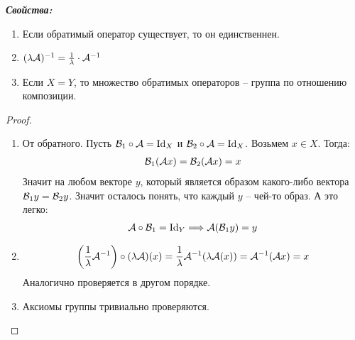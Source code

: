 \textit{\textbf{Свойства: }}
\begin{enumerate}
    \item Если обратимый оператор существует, то он единственнен. 
    \item $(\lambda \mathcal{A})^{-1} = \frac{1}{\lambda} \cdot \mathcal{A}^{-1}$
    \item Если $X = Y$, то множество обратимых операторов -- группа по отношению композиции. 
\end{enumerate}
\begin{proof} \quad

    \begin{enumerate}
        \item От обратного. Пусть $\mathcal{B}_1 \circ \mathcal{A} = \operatorname{Id}_X$ и $\mathcal{B}_2 \circ \mathcal{A} = \operatorname{Id}_X$. Возьмем $x \in X$. Тогда:
        \begin{gather*}
            \mathcal{B}_1(\mathcal{A} x) = \mathcal{B}_2(\mathcal{A} x) = x
        \end{gather*}
        Значит на любом векторе $y$, который является образом какого-либо вектора $\mathcal{B}_1 y = \mathcal{B}_2 y$. Значит осталось понять, что каждый $y$ -- чей-то образ. А это легко:
        \begin{gather*}
            \mathcal{A} \circ \mathcal{B}_1 = \operatorname{Id}_Y \Longrightarrow \mathcal{A}(\mathcal{B}_1 y) = y
        \end{gather*}
        \item \begin{gather*}
            \left( \frac{1}{\lambda} \mathcal{A}^{-1}\right) \circ (\lambda \mathcal{A})(x) = \frac{1}{\lambda} \mathcal{A}^{-1} (\lambda \mathcal{A}(x)) = \mathcal{A}^{-1} (\mathcal{A} x) = x
        \end{gather*}
        Аналогично проверяется в другом порядке. 
        \item Аксиомы группы тривиально проверяются. 
    \end{enumerate}
\end{proof}

\vspace*{5mm}

